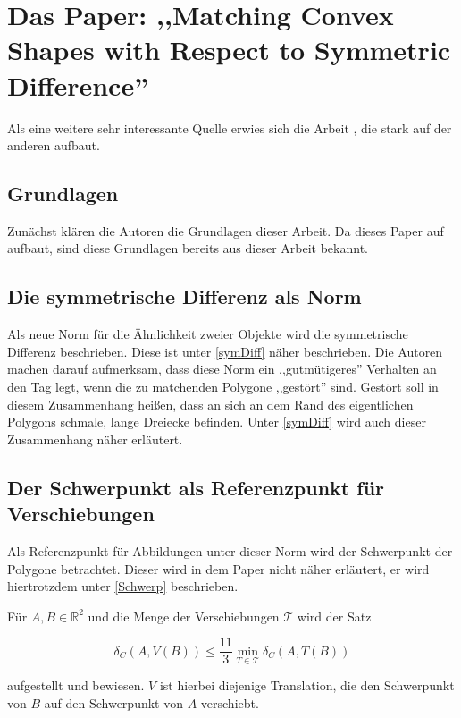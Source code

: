 \section[Matching Shapes with Symmetric Difference]{Das Paper: ,,Matching Convex Shapes with Respect to Symmetric Difference'' }\label{AFRWW}

Als eine weitere sehr interessante Quelle erwies sich die Arbeit \cite{AFRW}, die stark auf der anderen aufbaut. 

\subsection{Grundlagen}

Zunächst klären die Autoren die Grundlagen dieser Arbeit. Da dieses Paper auf \cite{AAR} aufbaut, sind diese Grundlagen bereits aus dieser Arbeit bekannt. 

\subsection{Die symmetrische Differenz als Norm}

Als neue Norm für die Ähnlichkeit zweier Objekte wird die symmetrische Differenz beschrieben. Diese ist unter  \vref{symDiff} näher beschrieben. Die Autoren machen darauf aufmerksam, dass diese Norm ein ,,gutmütigeres'' Verhalten an den Tag legt, wenn die zu matchenden Polygone ,,gestört'' sind. Gestört soll in diesem Zusammenhang heißen, dass an sich an dem Rand des eigentlichen Polygons schmale, lange Dreiecke befinden. Unter \vref{symDiff} wird auch dieser Zusammenhang näher erläutert.

\subsection{Der Schwerpunkt als Referenzpunkt für Verschiebungen}

Als Referenzpunkt für Abbildungen unter dieser Norm wird der Schwerpunkt der Polygone betrachtet. Dieser wird in dem Paper  nicht näher erläutert, er wird hiertrotzdem unter \vref{Schwerp} beschrieben. 

Für $A, B \in \mathbb{R}^2$ und  die Menge der Verschiebungen $\mathcal{T}$ wird der Satz

$$\delta_C (A,V(B))\leq\frac{11}{3}\min_{T\in\mathcal{T}}\delta_C(A,T(B))$$


aufgestellt und bewiesen. $V$ ist hierbei diejenige Translation, die den Schwerpunkt von $B$ auf den Schwerpunkt von $A$ verschiebt.

